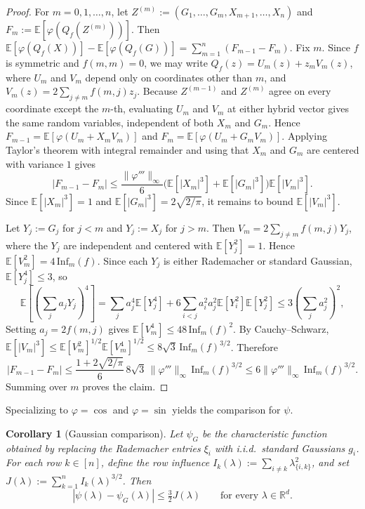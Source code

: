 \documentclass[11pt]{article}
\newtheorem{corollary}[theorem]{Corollary}
\theoremstyle{definition}
\newcommand{\R}{\mathbb{R}}
\newcommand{\E}{\mathbb{E}}
\begin{document}
\begin{proof}
For \(m=0,1,\dots,n\), let
\(Z^{(m)}:=(G_1,\dots,G_m,X_{m+1},\dots,X_n)\) and
\(F_m:=\E[\varphi(Q_f(Z^{(m)}))]\). Then
\(\E[\varphi(Q_f(X))]-\E[\varphi(Q_f(G))]=\sum_{m=1}^n(F_{m-1}-F_m)\).
Fix \(m\). Since \(f\) is symmetric and \(f(m,m)=0\), we may write
\(Q_f(z)=U_m(z)+z_mV_m(z)\), where \(U_m\) and \(V_m\) depend only on coordinates
other than \(m\), and \(V_m(z)=2\sum_{j\ne m}f(m,j)z_j\).
Because \(Z^{(m-1)}\) and \(Z^{(m)}\) agree on every coordinate except the \(m\)-th, evaluating \(U_m\) and \(V_m\) at either hybrid vector gives the same random variables, independent of both \(X_m\) and \(G_m\). Hence
\(F_{m-1}=\E[\varphi(U_m+X_mV_m)]\) and \(F_m=\E[\varphi(U_m+G_mV_m)]\).
Applying Taylor's theorem with integral remainder and using that \(X_m\) and
\(G_m\) are centered with variance \(1\) gives
\[
  |F_{m-1}-F_m|
  \le \frac{\|\varphi'''\|_\infty}{6}\bigl(\E[|X_m|^3]+\E[|G_m|^3]\bigr)\E[|V_m|^3].
\]
Since \(\E[|X_m|^3]=1\) and \(\E[|G_m|^3]=2\sqrt{2/\pi}\), it remains to bound
\(\E[|V_m|^3]\).

Let \(Y_j:=G_j\) for \(j<m\) and \(Y_j:=X_j\) for \(j>m\). Then
\(V_m=2\sum_{j\ne m} f(m,j)Y_j\),
where the \(Y_j\) are independent and centered with \(\E[Y_j^2]=1\).
Hence \(\E[V_m^2]=4\,\mathrm{Inf}_m(f)\).
Since each \(Y_j\) is either Rademacher or standard Gaussian, \(\E[Y_j^4]\le 3\), so
\[
  \E\!\left[\left(\sum_j a_jY_j\right)^4\right]
  =
  \sum_j a_j^4\E[Y_j^4]
  +6\sum_{i<j}a_i^2a_j^2\E[Y_i^2]\E[Y_j^2]
  \le 3\left(\sum_j a_j^2\right)^2,
\]
Setting \(a_j=2f(m,j)\) gives \(\E[V_m^4]\le 48\,\mathrm{Inf}_m(f)^2\). By
Cauchy--Schwarz,
\(\E[|V_m|^3]\le \E[V_m^2]^{1/2}\E[V_m^4]^{1/2}\le 8\sqrt3\,\mathrm{Inf}_m(f)^{3/2}\).
Therefore
\[
  |F_{m-1}-F_m|
  \le
  \frac{1+2\sqrt{2/\pi}}{6}\,8\sqrt3\,\|\varphi'''\|_\infty\,\mathrm{Inf}_m(f)^{3/2}
  \le 6\|\varphi'''\|_\infty\,\mathrm{Inf}_m(f)^{3/2}.
\]
Summing over \(m\) proves the claim.
\end{proof}

Specializing to \(\varphi=\cos\) and \(\varphi=\sin\) yields the comparison for \(\psi\).

\begin{corollary}[Gaussian comparison]\label{cor:weak-comparison}
Let \(\psi_G\) be the characteristic function obtained by replacing the Rademacher entries \(\xi_i\) with i.i.d.\ standard Gaussians \(g_i\). For each row \(k\in[n]\), define the row influence \(I_k(\lambda):=\sum_{i\ne k}\lambda_{\{i,k\}}^2\), and set \(J(\lambda):=\sum_{k=1}^n I_k(\lambda)^{3/2}\). Then
\[
  |\psi(\lambda)-\psi_G(\lambda)|\le \tfrac32 J(\lambda)
  \qquad\text{for every }\lambda\in\R^d.
\]
\end{corollary}
\end{document}
